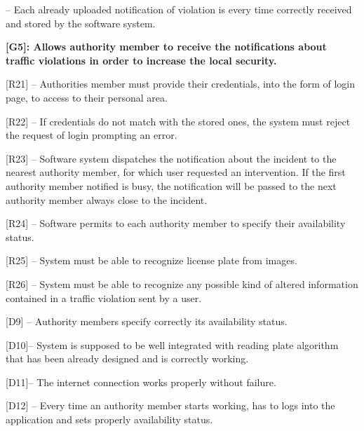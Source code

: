 \documentclass[12pt]{article}
\begin{document}
\begin{flushleft}
[D8] -- Each already uploaded notification of violation is every time correctly received and stored by the software system.
\vspace{2mm}

\vspace{4mm}
\textbf{[G5]: Allows authority member to receive the notifications about traffic violations in order to increase the local security.}
\vspace{2mm}

[R21] -- Authorities member must provide their credentials, into the form of login page, to access to their personal area.
\vspace{2mm}

[R22] – If credentials do not match with the stored ones, the system must reject the request of login prompting an error.
\vspace{2mm}

[R23] – Software system dispatches the notification about the incident to the nearest authority member, for which user requested an intervention. If the first authority member notified is busy, the notification will be passed to the next authority member always close to the incident.
\vspace{2mm}

[R24] –  Software permits to each authority member to specify their availability status.
\vspace{2mm}

[R25] – System must be able to recognize license plate from images.
\vspace{2mm}

[R26] – System must be able to recognize any possible kind of altered information contained in a traffic violation sent by a user.
\vspace{2mm}

[D9] -- Authority members specify correctly its availability status.
\vspace{2mm}

[D10]-- System is supposed to be well integrated with reading plate algorithm that has been already designed and is correctly working.
\vspace{2mm}

[D11]-- The internet connection works properly without failure.
\vspace{2mm}

[D12] – Every time an authority member starts working, has to logs into the application and sets properly availability status.
\vspace{2mm}


\end{flushleft}
\end{document}
